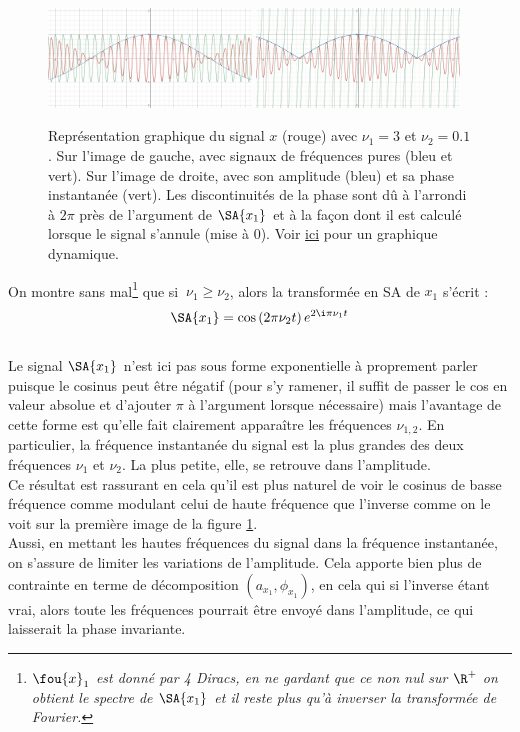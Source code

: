 \begin{figure}[h]\centering
	\includegraphics[width=0.48\textwidth]{fig/part-1/ex SA - 11.png}
	\hfill
	\includegraphics[width=0.48\textwidth]{fig/part-1/ex SA - 12.png}
	\caption{Représentation graphique du signal $x$ (rouge) avec $\nu_1=3$ et $\nu_2=0.1$. Sur l'image de gauche, avec signaux de fréquences pures (bleu et vert). Sur l'image de droite, avec son amplitude (bleu) et sa phase instantanée (vert). Les discontinuités de la phase sont dû à l'arrondi à $2\pi$  près de l'argument de $\SA{x_1}$ et à la façon dont il est calculé lorsque le signal s'annule (mise à 0). Voir \href{https://www.desmos.com/calculator/gcedcdfkhr}{ici} pour un graphique dynamique.}
	\label{fig:exemple_tSA_1/2}
\end{figure}

\noindent
On montre sans mal\footnote{\itshape
	$\fou{x}_1$ est donné par 4 Diracs, en ne gardant que ce non nul sur $\R^+$ on obtient le spectre de $\SA{x_1}$ et il reste plus qu'à inverser la transformée de Fourier.}
que si $\ \nu_1\geq\nu_2$, alors la transformée en SA de $x_1$ s'écrit :
\[\SA{x_1} = \cos \left(2\pi\nu_2 t\right) e^{2\i\pi\nu_1 t}\]
\\
Le signal $\SA{x_1}$ n'est ici pas sous forme exponentielle à proprement parler puisque le cosinus peut être négatif (pour s'y ramener, il suffit de passer le cos en valeur absolue et d'ajouter $\pi$ à l'argument lorsque nécessaire) mais l’avantage de cette forme est qu'elle fait clairement apparaître les fréquences $\nu_{1,2}$. En particulier, la fréquence instantanée du signal est la plus grandes des deux fréquences $\nu_1$ et $\nu_2$. La plus petite, elle, se retrouve dans l'amplitude. 
\\
Ce résultat est rassurant en cela qu'il est plus naturel de voir le cosinus de basse fréquence comme modulant celui de haute fréquence que l'inverse comme on le voit sur la première image de la figure \ref{fig:exemple_tSA_1/2}. 
\\
Aussi, en mettant les hautes fréquences du signal dans la fréquence instantanée, on s'assure de limiter les variations de l'amplitude. Cela apporte bien plus de contrainte en terme de décomposition $(a_{x_1},\phi_{x_1})$, en cela qui si l'inverse étant vrai, alors toute les fréquences pourrait être envoyé dans l'amplitude, ce qui laisserait la phase invariante.
\\


